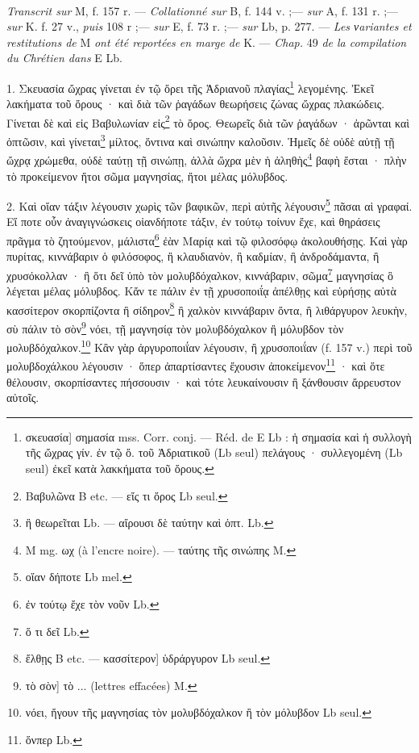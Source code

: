 \documentclass[a4paper, 11pt, oneside, polutonikogreek, french]{article}
\begin{document}
\paragraph{}
\emph{Transcrit sur} M, f. 157 r. --- \emph{Collationné sur} B, f. 144 v. ;--- \emph{sur} A, f. 131 r. ;--- \emph{sur} K. f. 27 v., \emph{puis} 108 r ;--- \emph{sur} E, f. 73 r. ;--- \emph{sur} Lb, p. 277. --- \emph{Les νariantes et restitutions de} M \emph{ont été reportées en marge de} K. --- \emph{Chap.} 49 \emph{de la compilation du Chrétien dans} E Lb.

\bigskip

1. Σκευασία ὤχρας γίνεται ἐν τῷ ὄρει τῆς Ἁδριανοῦ πλαγίας\footnote{σκευασία] σημασία mss. Corr. conj. --- Réd. de E Lb : ἡ σημασία καὶ ἡ συλλογὴ τῆς ὤχρας γίν. ἐν τῷ ὄ. τοῦ Ἀδριατικοῦ (Lb seul) πελάγους · συλλεγομένη (Lb seul) ἐκεῖ κατὰ λακκήματα τοῦ ὄρους.} λεγομένης. Ἐκεῖ λακήματα τοῦ ὄρους · καὶ διὰ τῶν ῥαγάδων θεωρήσεις ζώνας ὤχρας πλακώδεις. Γίνεται δὲ καὶ εἰς Βαβυλωνίαν εἰς\footnote{Bαβυλῶνα B etc. --- εἴς τι ὄρος Lb seul.} τὸ ὄρος. Θεωρεῖς διὰ τῶν ῥαγάδων · ἀρῶνται καὶ ὀπτῶσιν, καὶ γίνεται\footnote{ἣ θεωρεῖται Lb. --- αἴρουσι δὲ ταύτην καὶ ὀπτ. Lb.} μίλτος, ὅντινα καὶ σινώπην καλοῦσιν. Ἡμεῖς δὲ οὐδὲ αὐτῇ τῇ ὤχρᾳ χρώμεθα, οὐδὲ ταύτῃ τῇ σινώπῃ, ἀλλὰ ὤχρα μὲν ἡ ἀληθὴς\footnote{M mg. ωχ (à l'encre noire). --- ταύτης τῆς σινώπης M.} βαφὴ ἔσται · πλὴν τὸ προκείμενον ἤτοι σῶμα μαγνησίας, ἤτοι μέλας μόλυβδος.

2. Καὶ οἵαν τάξιν λέγουσιν χωρὶς τῶν βαφικῶν, περὶ αὐτῆς λέγουσιν\footnote{οἵαν δήποτε Lb mel.} πᾶσαι αἱ γραφαί. Εἴ ποτε οὖν ἀναγιγνώσκεις οἱανδήποτε τάξιν, ἐν τούτῳ τοίνυν ἔχε, καὶ θηράσεις πρᾶγμα τὸ ζητούμενον, μάλιστα\footnote{ἐν τούτῳ ἔχε τὸν νοῦν Lb.} ἐὰν Μαρίᾳ καὶ τῷ φιλοσόφῳ ἀκολουθήσῃς. Καὶ γὰρ πυρίτας, κιννάβαριν ὁ φιλόσοφος, ἢ κλαυδιανὸν, ἢ καδμίαν, ἢ ἀνδροδάμαντα, ἢ χρυσόκολλαν · ἢ ὅτι δεῖ ὑπὸ τὸν μολυβδόχαλκον, κιννάβαριν, σῶμα\footnote{ὅ τι δεῖ Lb.} μαγνησίας ὃ λέγεται μέλας μόλυβδος. Κἄν τε πάλιν ἐν τῇ χρυσοποιΐᾳ ἀπέλθῃς καὶ εὑρήσῃς αὐτὰ κασσίτερον σκορπίζοντα ἢ σίδηρον\footnote{ἔλθῃς B etc. --- κασσίτερον] ὑδράργυρον Lb seul.} ἢ χαλκὸν κιννάβαριν ὄντα, ἢ λιθάργυρον λευκὴν, σὺ πάλιν τὸ σὸν\footnote{τὸ σὸν] τὸ ... (lettres effacées) M.} νόει, τῇ μαγνησίᾳ τὸν μολυβδόχαλκον ἢ μόλυβδον τὸν μολυβδόχαλκον.\footnote{νόει, ἤγουν τῆς μαγνησίας τὸν μολυβδόχαλκον ἢ τὸν μόλυβδον Lb seul.} Κἂν γὰρ ἀργυροποιΐαν λέγουσιν, ἢ χρυσοποιΐαν (f. 157 v.) περὶ τοῦ μολυβδοχάλκου λέγουσιν · ὅπερ ἀπαρτίσαντες ἔχουσιν ἀποκείμενον\footnote{ὅνπερ Lb.} · καὶ ὅτε θέλουσιν, σκορπίσαντες πήσσουσιν · καὶ τότε λευκαίνουσιν ἢ ξάνθουσιν ἄρρευστον αὐτοῖς.
\end{document}
